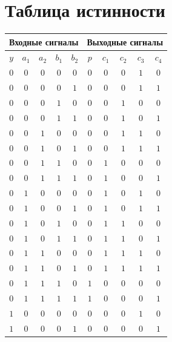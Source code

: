 \documentclass[12pt,a4paper]{report}
\begin{document}
\section*{Таблица истинности}
\small
\begin{tabular}{|c|cc|cc||c|cccc|}
    \hline
    \multicolumn{5}{|c||}{Входные сигналы} & \multicolumn{5}{c|}{Выходные сигналы}\\
    \hline
    $y$ & $a_1$ & $a_2$ & $b_1$ & $b_2$ & $p$ & $c_1$ & $c_2$ & $c_3$ & $c_4$\\
    \hline
    $0$ & $0$ & $0$ & $0$ & $0$ & $0$ & $0$ & $0$ & $1$ & $0$\\
    \hline
    $0$ & $0$ & $0$ & $0$ & $1$ & $0$ & $0$ & $0$ & $1$ & $1$\\
    \hline
    $0$ & $0$ & $0$ & $1$ & $0$ & $0$ & $0$ & $1$ & $0$ & $0$\\
    \hline
    $0$ & $0$ & $0$ & $1$ & $1$ & $0$ & $0$ & $1$ & $0$ & $1$\\
    \hline
    $0$ & $0$ & $1$ & $0$ & $0$ & $0$ & $0$ & $1$ & $1$ & $0$\\
    \hline
    $0$ & $0$ & $1$ & $0$ & $1$ & $0$ & $0$ & $1$ & $1$ & $1$\\
    \hline
    $0$ & $0$ & $1$ & $1$ & $0$ & $0$ & $1$ & $0$ & $0$ & $0$\\
    \hline
    $0$ & $0$ & $1$ & $1$ & $1$ & $0$ & $1$ & $0$ & $0$ & $1$\\
    \hline
    $0$ & $1$ & $0$ & $0$ & $0$ & $0$ & $1$ & $0$ & $1$ & $0$\\
    \hline
    $0$ & $1$ & $0$ & $0$ & $1$ & $0$ & $1$ & $0$ & $1$ & $1$\\
    \hline
    $0$ & $1$ & $0$ & $1$ & $0$ & $0$ & $1$ & $1$ & $0$ & $0$\\
    \hline
    $0$ & $1$ & $0$ & $1$ & $1$ & $0$ & $1$ & $1$ & $0$ & $1$\\
    \hline
    $0$ & $1$ & $1$ & $0$ & $0$ & $0$ & $1$ & $1$ & $1$ & $0$\\
    \hline
    $0$ & $1$ & $1$ & $0$ & $1$ & $0$ & $1$ & $1$ & $1$ & $1$\\
    \hline
    $0$ & $1$ & $1$ & $1$ & $0$ & $1$ & $0$ & $0$ & $0$ & $0$\\
    \hline
    $0$ & $1$ & $1$ & $1$ & $1$ & $1$ & $0$ & $0$ & $0$ & $1$\\
    \hline
    $1$ & $0$ & $0$ & $0$ & $0$ & $0$ & $0$ & $0$ & $1$ & $0$\\
    \hline
    $1$ & $0$ & $0$ & $0$ & $1$ & $0$ & $0$ & $0$ & $0$ & $1$\\

\end{tabular}
\end{document}
